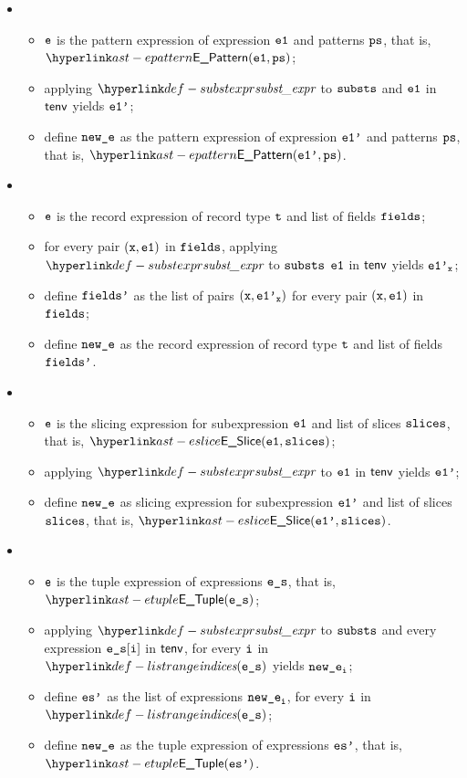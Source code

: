 \begin{itemize}
  \item {}
  \begin{itemize}
    \item $\texttt{e}$ is the pattern expression of expression $\texttt{e1}$ and patterns $\texttt{ps}$, that is, \\
          $\EPattern(\veone, \vps)$;
    \item applying $\substexpr$ to $\texttt{substs}$ and $\texttt{e1}$ in $\textsf{tenv}$ yields $\texttt{e1'}$;
    \item define $\texttt{new\_e}$ as the pattern expression of expression $\texttt{e1'}$ and patterns $\texttt{ps}$, that is, $\EPattern(\veonep, \vps)$.
  \end{itemize}

  \item {}
  \begin{itemize}
    \item $\texttt{e}$ is the record expression of record type $\texttt{t}$ and list of fields $\texttt{fields}$;
    \item for every pair $(\texttt{x},\texttt{e1})$ in $\texttt{fields}$, applying $\substexpr$ to $\texttt{substs}$ $\texttt{e1}$ in $\textsf{tenv}$ yields $\texttt{e1'}_{\texttt{x}}$;
    \item define $\texttt{fields'}$ as the list of pairs $(\texttt{x},\texttt{e1'}_{\texttt{x}})$ for every pair $(\texttt{x},\texttt{e1})$ in $\texttt{fields}$;
    \item define $\texttt{new\_e}$ as the record expression of record type $\texttt{t}$ and list of fields $\texttt{fields'}$.
  \end{itemize}

  \item {}
  \begin{itemize}
    \item $\texttt{e}$ is the slicing expression for subexpression $\texttt{e1}$ and list of slices $\texttt{slices}$, that is, $\ESlice(\veone, \vslices)$;
    \item applying $\substexpr$ to $\texttt{e1}$ in $\textsf{tenv}$ yields $\texttt{e1'}$;
    \item define $\texttt{new\_e}$ as slicing expression for subexpression $\texttt{e1'}$ and list of slices $\texttt{slices}$, that is, $\ESlice(\veonep, \vslices)$.
  \end{itemize}

  \item {}
  \begin{itemize}
    \item $\texttt{e}$ is the tuple expression of expressions $\texttt{e\_s}$, that is, $\ETuple(\ves)$;
    \item applying $\substexpr$ to $\texttt{substs}$ and every expression $\texttt{e\_s}[\texttt{i}]$ in $\textsf{tenv}$, for every $\texttt{i}$ in $\listrange(\ves)$
          yields $\texttt{new\_e}_{\texttt{i}}$;
    \item define $\texttt{es'}$ as the list of expressions $\texttt{new\_e}_{\texttt{i}}$, for every $\texttt{i}$ in $\listrange(\ves)$;
    \item define $\texttt{new\_e}$ as the tuple expression of expressions $\texttt{es'}$, that is, $\ETuple(\vesp)$.
  \end{itemize}


\end{itemize}
